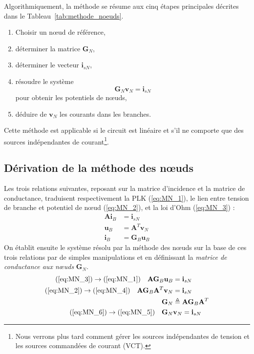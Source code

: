 Algorithmiquement, la méthode se résume aux cinq étapes principales décrites dans le Tableau~\ref{tab:methode_noeuds}.
\begin{table}[tb]
	\caption{Vue algorithmique de la méthode des nœuds. \label{tab:methode_noeuds}}
	\begin{boxedminipage}{\textwidth}
	\begin{enumerate}
	\item Choisir un nœud de référence,
	\item déterminer la matrice $\mathbf{G}_N$,
	\item déterminer le vecteur $\mathbf{i}_{sN}$,
	\item résoudre le système $$\mathbf{G}_N \mathbf{v}_N = \mathbf{i}_{sN}$$ pour obtenir les potentiels de nœuds,
	\item déduire de $\mathbf{v}_N$ les courants dans les branches.
	\end{enumerate}
	\end{boxedminipage}
\end{table}
Cette méthode est applicable si le circuit est linéaire et s'il ne comporte que des sources indépendantes de courant\footnote{ Nous verrons plus tard comment gérer les sources indépendantes de tension et les sources commandées de courant (VCT).}.

\subsection{Dérivation de la méthode des nœuds}

Les trois relations suivantes, reposant sur la matrice d'incidence et la matrice de conductance, traduisent respectivement la PLK (\ref{eq:MN_1}), le lien entre tension de branche et potentiel de nœud (\ref{eq:MN_2}), et la loi d'Ohm (\ref{eq:MN_3}) :
\begin{align}
\mathbf{A} \mathbf{i}_B &= \mathbf{i}_{sN} \label{eq:MN_1}\\
\mathbf{u}_B &= \mathbf{A}^T \mathbf{v}_{N} \label{eq:MN_2}\\
\mathbf{i}_B &= \mathbf{G}_B \mathbf{u}_{B} \label{eq:MN_3}
\end{align}
On établit ensuite le système résolu par la méthode des nœuds sur la base de ces trois relations par de simples manipulations et en définissant la \textit{matrice de conductance aux nœuds} $\mathbf{G}_N.$
\begin{align}
(\ref{eq:MN_3}) \rightarrow (\ref{eq:MN_1}) \quad \mathbf{A} \mathbf{G}_B \mathbf{u}_{B} &= \mathbf{i}_{sN} \label{eq:MN_4}\\
(\ref{eq:MN_2}) \rightarrow (\ref{eq:MN_4}) \quad \mathbf{A} \mathbf{G}_B \mathbf{A}^T \mathbf{v}_{N} &= \mathbf{i}_{sN} \label{eq:MN_5}\\
\mathbf{G}_N &\triangleq \mathbf{A} \mathbf{G}_B \mathbf{A}^T \label{eq:MN_6}\\
(\ref{eq:MN_6}) \rightarrow (\ref{eq:MN_5}) \quad \mathbf{G}_N &\mathbf{v}_N = \mathbf{i}_{sN}
\end{align}


